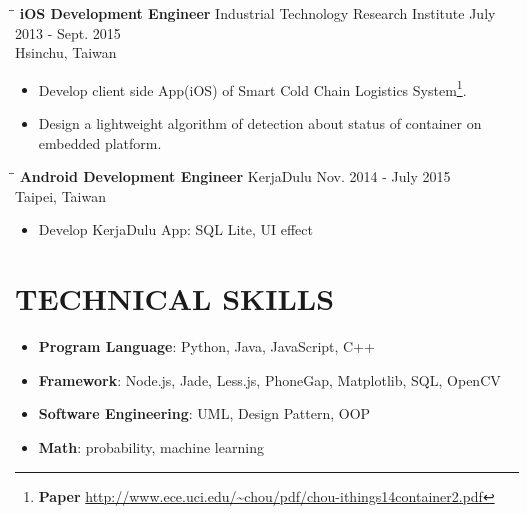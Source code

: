 \documentclass{res}
\begin{document}
\begin{resume}
\begin{itemize}
				\end{itemize}
				\begin{tabbing}
	 				\hspace{2.3in}\= \hspace{2.6in}\= \kill %
					{\bf iOS Development Engineer} \>Industrial Technology Research Institute	
					\>July 2013 - Sept. 2015\\
													\>Hsinchu, Taiwan
	 			\end{tabbing}\vspace{-20pt}
	 			\vspace{0.2in}	
				\begin{itemize}
					\item Develop client side App(iOS) of Smart Cold Chain Logistics System\footnote{​{\bf Paper}  \url{http://www.ece.uci.edu/~chou/pdf/chou-ithings14container2.pdf}}.
					\vspace{-0.05in}	
					\item Design a lightweight algorithm of detection about status of container on embedded platform.
				\end{itemize}
				\begin{tabbing}%
					\hspace{2.3in}\= \hspace{2.6in}\= \kill %
	 				{\bf Android Development Engineer }  \>KerjaDulu\> Nov. 2014 - July 2015\\
													\>Taipei, Taiwan
				\end{tabbing}\vspace{-20pt}
				\vspace{0.2in}	
				\begin{itemize}
					\item Develop KerjaDulu App: SQL Lite, UI effect
				\end{itemize}

			
			\section{TECHNICAL SKILLS}          
				\begin{itemize}
					\item {\bf Program Language}: Python, Java, JavaScript, C++
					\vspace{-0.05in}
					\item {\bf Framework}: Node.js, Jade, Less.js, PhoneGap, Matplotlib, SQL, OpenCV
					\vspace{-0.05in}
					\item {\bf Software Engineering}: UML, Design Pattern, OOP
					\vspace{-0.05in}
					\item {\bf Math}: probability, machine learning	
				\end{itemize}


\end{resume}
\end{document}
